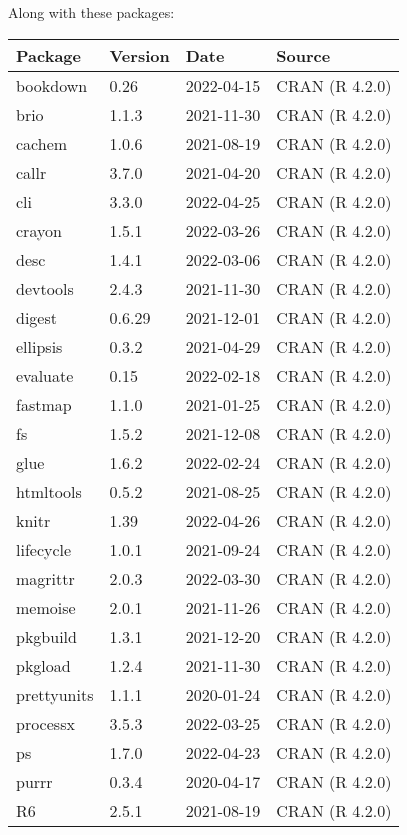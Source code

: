 \documentclass[
]{book}
\theoremstyle{definition}
\theoremstyle{definition}
\theoremstyle{definition}
\theoremstyle{definition}
\theoremstyle{remark}
\begin{document}
Along with these packages:

\begin{tabular}{l|l|l|l}
\hline
Package & Version & Date & Source\\
\hline
bookdown & 0.26 & 2022-04-15 & CRAN (R 4.2.0)\\
\hline
brio & 1.1.3 & 2021-11-30 & CRAN (R 4.2.0)\\
\hline
cachem & 1.0.6 & 2021-08-19 & CRAN (R 4.2.0)\\
\hline
callr & 3.7.0 & 2021-04-20 & CRAN (R 4.2.0)\\
\hline
cli & 3.3.0 & 2022-04-25 & CRAN (R 4.2.0)\\
\hline
crayon & 1.5.1 & 2022-03-26 & CRAN (R 4.2.0)\\
\hline
desc & 1.4.1 & 2022-03-06 & CRAN (R 4.2.0)\\
\hline
devtools & 2.4.3 & 2021-11-30 & CRAN (R 4.2.0)\\
\hline
digest & 0.6.29 & 2021-12-01 & CRAN (R 4.2.0)\\
\hline
ellipsis & 0.3.2 & 2021-04-29 & CRAN (R 4.2.0)\\
\hline
evaluate & 0.15 & 2022-02-18 & CRAN (R 4.2.0)\\
\hline
fastmap & 1.1.0 & 2021-01-25 & CRAN (R 4.2.0)\\
\hline
fs & 1.5.2 & 2021-12-08 & CRAN (R 4.2.0)\\
\hline
glue & 1.6.2 & 2022-02-24 & CRAN (R 4.2.0)\\
\hline
htmltools & 0.5.2 & 2021-08-25 & CRAN (R 4.2.0)\\
\hline
knitr & 1.39 & 2022-04-26 & CRAN (R 4.2.0)\\
\hline
lifecycle & 1.0.1 & 2021-09-24 & CRAN (R 4.2.0)\\
\hline
magrittr & 2.0.3 & 2022-03-30 & CRAN (R 4.2.0)\\
\hline
memoise & 2.0.1 & 2021-11-26 & CRAN (R 4.2.0)\\
\hline
pkgbuild & 1.3.1 & 2021-12-20 & CRAN (R 4.2.0)\\
\hline
pkgload & 1.2.4 & 2021-11-30 & CRAN (R 4.2.0)\\
\hline
prettyunits & 1.1.1 & 2020-01-24 & CRAN (R 4.2.0)\\
\hline
processx & 3.5.3 & 2022-03-25 & CRAN (R 4.2.0)\\
\hline
ps & 1.7.0 & 2022-04-23 & CRAN (R 4.2.0)\\
\hline
purrr & 0.3.4 & 2020-04-17 & CRAN (R 4.2.0)\\
\hline
R6 & 2.5.1 & 2021-08-19 & CRAN (R 4.2.0)\\

\end{tabular}
\end{document}
